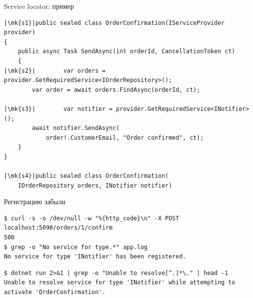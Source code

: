 \documentclass[aspectratio=169,10pt,t]{beamer}
\newcommand{\codexs}{\ttfamily\fontsize{7.0}{8.3}\selectfont}
\newcommand{\termsm}{\ttfamily\fontsize{6.6}{7.9}\selectfont}
\newcommand{\mk}[1]{\tikz[remember picture,overlay]\coordinate (#1) at (0,0.55ex);}
\begin{document}
\begin{frame}[fragile]{Service locator: пример}
  \slidetop
\begin{lstlisting}[style=csharp,basicstyle=\codexs,escapechar=|]
|\mk{s1}|public sealed class OrderConfirmation(IServiceProvider provider)
{
    public async Task SendAsync(int orderId, CancellationToken ct)
    {
|\mk{s2}|        var orders = provider.GetRequiredService<IOrderRepository>();
        var order = await orders.FindAsync(orderId, ct);

|\mk{s3}|        var notifier = provider.GetRequiredService<INotifier>();
        await notifier.SendAsync(
            order!.CustomerEmail, "Order confirmed", ct);
    }
}

|\mk{s4}|public sealed class OrderConfirmation(
    IOrderRepository orders, INotifier notifier)
\end{lstlisting}

\end{frame}

\begin{frame}[fragile]{Регистрацию забыли}
  \slidetop

  \par
  \vspace{0.5em}
\begin{lstlisting}[style=term,basicstyle=\termsm]
$ curl -s -o /dev/null -w "%{http_code}\n" -X POST localhost:5090/orders/1/confirm
500
$ grep -o "No service for type.*" app.log
No service for type 'INotifier' has been registered.
\end{lstlisting}

  \par
  \vspace{0.5em}
\begin{lstlisting}[style=term,basicstyle=\termsm]
$ dotnet run 2>&1 | grep -o "Unable to resolve[^.]*\." | head -1
Unable to resolve service for type 'INotifier' while attempting to activate 'OrderConfirmation'.
\end{lstlisting}

\end{frame}
\end{document}
